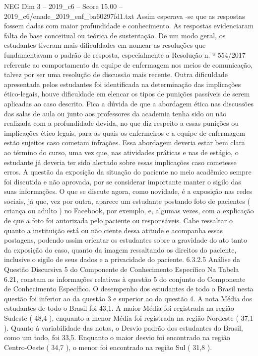 \begin{textsample}{NEG Dim 3 – 2019\_c6 – Score 15.00 – 2019\_c6/enade\_2019\_enf\_ba60297fd1.txt}
Assim esperava -se que as respostas fossem dadas com maior profundidade e conhecimento.
As respostas evidenciaram falta de base conceitual ou teórica de sustentação.
De um modo geral, os estudantes tiveram mais dificuldades em nomear as resoluções que fundamentavam o padrão de resposta, especialmente a Resolução n. º 554/2017 referente ao comportamento da equipe de enfermagem nos meios de comunicação, talvez por ser uma resolução de discussão mais recente.
Outra dificuldade apresentada pelos estudantes foi identificada na determinação das implicações ético-legais, houve dificuldade em elencar os tipos de punições passíveis de serem aplicadas ao caso descrito.
Fica a dúvida de que a abordagem ética nas discussões das salas de aula ou junto aos professores da academia tenha sido ou não realizada com a profundidade devida, no que diz respeito a essas punições ou implicações ético-legais, para as quais os enfermeiros e a equipe de enfermagem estão sujeitos caso cometam infrações.
Essa abordagem deveria estar bem clara ao término do curso, uma vez que, nas atividades práticas e nas de estágio, o estudante já deveria ter sido alertado sobre essas implicações caso cometesse erros.
A questão da exposição da situação do paciente no meio acadêmico sempre foi discutida e não aprovada, por se considerar importante manter o sigilo das suas informações.
O que se discute agora, como novidade, é a exposição nas redes sociais, já que, vez por outra, aparece um estudante postando foto de pacientes ( criança ou adulto ) no Facebook, por exemplo, e, algumas vezes, com a explicação de que a foto foi autorizada pelo paciente ou responsáveis.
Cabe ressaltar o quanto a instituição está ou não ciente dessa atitude e acompanha essas postagens, podendo assim orientar os estudantes sobre a gravidade do ato tanto da exposição do caso, quanto da imagem ressaltando os direitos do paciente, inclusive o sigilo de seus dados e a privacidade do paciente. 6.3.2.5 Análise da Questão Discursiva 5 do Componente de Conhecimento Específico Na Tabela 6.21, constam as informações relativas à questão 5 do conjunto do Componente de Conhecimento Específico.
O desempenho dos estudantes de todo o Brasil nesta questão foi inferior ao da questão 3 e superior ao da questão 4.
A nota Média dos estudantes de todo o Brasil foi 43,1.
A maior Média foi registrada na região Sudeste ( 48,4 ), enquanto a menor Média foi registrada na região Nordeste ( 37,1 ).
Quanto à variabilidade das notas, o Desvio padrão dos estudantes do Brasil, como um todo, foi 33,5.
Enquanto o maior desvio foi encontrado na região Centro-Oeste ( 34,7 ), o menor foi encontrado na região Sul ( 31,8 ).

\end{textsample}
